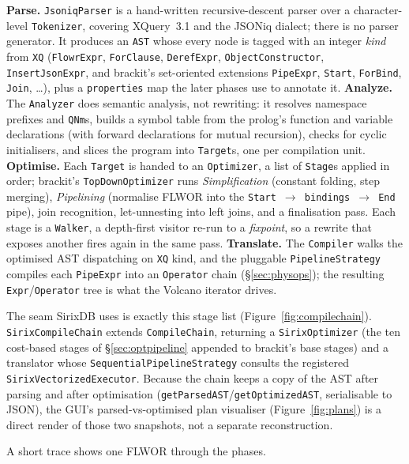 \documentclass[11pt,a4paper,oneside]{report}
\theoremstyle{sirixthm}
\newcommand{\code}[1]{\texttt{#1}}
\begin{document}
\textbf{Parse.} \code{JsoniqParser} is a hand-written recursive-descent parser over a character-level
\code{Tokenizer}, covering XQuery~3.1 and the JSONiq dialect; there is no parser generator. It produces
an \code{AST} whose every node is tagged with an integer \emph{kind} from \code{XQ} (\code{FlowrExpr},
\code{ForClause}, \code{DerefExpr}, \code{ObjectConstructor}, \code{InsertJsonExpr}, and brackit's
set-oriented extensions \code{PipeExpr}, \code{Start}, \code{ForBind}, \code{Join}, \ldots), plus a
\code{properties} map the later phases use to annotate it. \textbf{Analyze.} The \code{Analyzer} does
semantic analysis, not rewriting: it resolves namespace prefixes and \code{QNm}s, builds a symbol table
from the prolog's function and variable declarations (with forward declarations for mutual recursion),
checks for cyclic initialisers, and slices the program into \code{Target}s, one per compilation unit.
\textbf{Optimise.} Each \code{Target} is handed to an \code{Optimizer}, a list of \code{Stage}s applied
in order; brackit's \code{TopDownOptimizer} runs \emph{Simplification} (constant folding, step merging),
\emph{Pipelining} (normalise FLWOR into the \code{Start\,$\to$\,bindings\,$\to$\,End} pipe), join
recognition, let-unnesting into left joins, and a finalisation pass. Each stage is a \code{Walker}, a
depth-first visitor re-run to a \emph{fixpoint}, so a rewrite that exposes another fires again in the
same pass. \textbf{Translate.} The \code{Compiler} walks the optimised AST dispatching on \code{XQ} kind,
and the pluggable \code{PipelineStrategy} compiles each \code{PipeExpr} into an \code{Operator} chain
(\S\ref{sec:physops}); the resulting \code{Expr}/\code{Operator} tree is what the Volcano iterator drives.

The seam SirixDB uses is exactly this stage list (Figure~\ref{fig:compilechain}). \code{SirixCompileChain} extends \code{CompileChain},
returning a \code{SirixOptimizer} (the ten cost-based stages of \S\ref{sec:optpipeline} appended to
brackit's base stages) and a translator whose \code{SequentialPipelineStrategy} consults the registered
\code{SirixVectorizedExecutor}. Because the chain keeps a copy of the AST after parsing and after
optimisation (\code{getParsedAST}/\allowbreak\code{getOptimizedAST}, serialisable to JSON), the GUI's
parsed-vs-optimised plan visualiser (Figure~\ref{fig:plans}) is a direct render of those two snapshots,
not a separate reconstruction.

A short trace shows one FLWOR through the phases.
\end{document}
